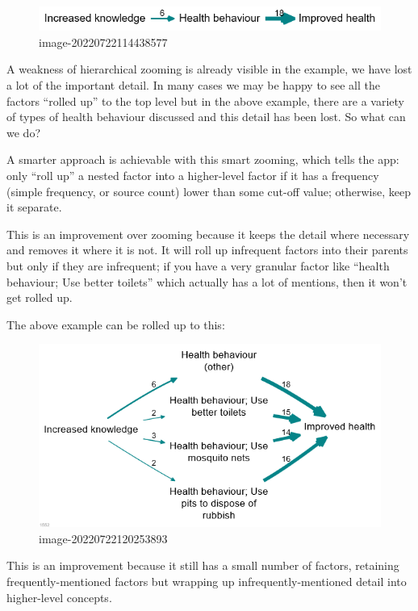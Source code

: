 \documentclass[
]{book}
\begin{document}
\begin{figure}
\centering
\includegraphics{_assets/image-20220722114438577.png}
\caption{image-20220722114438577}
\end{figure}

A weakness of hierarchical zooming is already visible in the example, we have lost a lot of the important detail. In many cases we may be happy to see all the factors ``rolled up'' to the top level but in the above example, there are a variety of types of health behaviour discussed and this detail has been lost. So what can we do?

A smarter approach is achievable with this smart zooming, which tells the app: only ``roll up'' a nested factor into a higher-level factor if it has a frequency (simple frequency, or source count) lower than some cut-off value; otherwise, keep it separate.

This is an improvement over zooming because it keeps the detail where necessary and removes it where it is not. It will roll up infrequent factors into their parents but only if they are infrequent; if you have a very granular factor like ``health behaviour; Use better toilets'' which actually has a lot of mentions, then it won't get rolled up.

The above example can be rolled up to this:

\begin{figure}
\centering
\includegraphics{_assets/image-20220722120253893.png}
\caption{image-20220722120253893}
\end{figure}

This is an improvement because it still has a small number of factors, retaining frequently-mentioned factors but wrapping up infrequently-mentioned detail into higher-level concepts.
\end{document}
